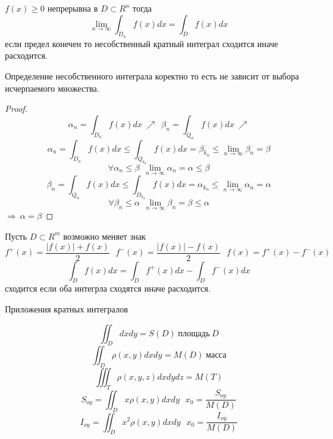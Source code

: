 \begin{define}
  $f(x) \ge 0$ непрерывна в $D \subset R^n$ тогда
  $$
  \lim_{n \to \infty} \int_{D_n} f(x) dx = \int_D f(x) dx
  $$
  если предел конечен то несобственный кратный интеграл сходится иначе
  расходится.
\end{define}

\begin{theorem}
  Определение несобственного интеграла коректно то есть не зависит от выбора
  исчерпаемого множества.
\end{theorem}

\begin{proof}
  $$
  \alpha_n = \int_{D_n} f(x) dx ~ \nearrow ~~ \beta_n = \int_{Q_n} f(x) dx ~
  \nearrow
  $$
  $$
  \alpha_n = \int_{D_n} f(x) dx \le \int_{Q_{k_n}} f(x) dx = \beta_{k_n} \le
  \lim_{n \to \infty} \beta_n = \beta
  $$
  $$
  \forall \alpha_n \le \beta ~~ \lim_{n \to \infty} \alpha_n = \alpha \le \beta
  $$
  $$
  \beta_n = \int_{Q_n} f(x) dx \le \int_{D_{k_n}} f(x) dx = \alpha_{k_n} \le
  \lim_{n \to \infty} \alpha_n = \alpha
  $$
  $$
  \forall \beta_n \le \alpha ~~ \lim_{n \to \infty} \beta_n = \beta \le \alpha
  $$
  $\Rightarrow ~ \alpha = \beta$
\end{proof}

\begin{theorem}
  Пусть $D \subset R^m$ возможно меняет знак
  $$
  f^+(x) = \frac{|f(x)| + f(x)}{2} ~~~
  f^-(x) = \frac{|f(x)| - f(x)}{2} ~~~
  f(x) = f^+(x) - f^-(x)
  $$
  $$
  \int_D f(x) dx = \int_D f^+(x) dx - \int_D f^-(x)dx
  $$
  сходится если оба интегрла сходятся иначе расходится.
\end{theorem}

\begin{title}[\Large]
  Приложения кратных интегралов
\end{title}
$$
\iint_D dx dy = S(D) ~ \text{площадь} ~ D
$$
$$
\iint_D \rho(x,y) dx dy = M(D) ~ \text{масса}
$$
$$
\iiint_T \rho(x,y,z) dx dy dz = M(T)
$$
$$
S_{oy} = \iint_D x \rho(x,y) dx dy ~~~ x_0 = \frac{S_{oy}}{M(D)}
$$
$$
I_{oy} = \iint_D x^2 \rho(x,y)dx dy ~~~ x_0 = \frac{I_{oy}}{M(D)}
$$